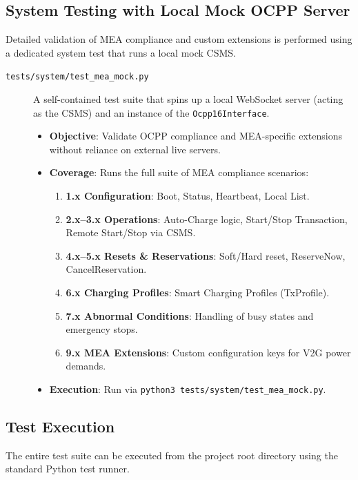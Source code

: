 \documentclass[a4paper,11pt]{report}
\begin{document}
\subsection{System Testing with Local Mock OCPP Server}
Detailed validation of MEA compliance and custom extensions is performed using a dedicated system test that runs a local mock CSMS.
\begin{description}
    \item[\texttt{tests/system/test\_mea\_mock.py}] A self-contained test suite that spins up a local WebSocket server (acting as the CSMS) and an instance of the \texttt{Ocpp16Interface}.
    \begin{itemize}
        \item \textbf{Objective}: Validate OCPP compliance and MEA-specific extensions without reliance on external live servers.
        \item \textbf{Coverage}: Runs the full suite of MEA compliance scenarios:
        \begin{enumerate}
            \item \textbf{1.x Configuration}: Boot, Status, Heartbeat, Local List.
            \item \textbf{2.x--3.x Operations}: Auto-Charge logic, Start/Stop Transaction, Remote Start/Stop via CSMS.
            \item \textbf{4.x--5.x Resets \& Reservations}: Soft/Hard reset, ReserveNow, CancelReservation.
            \item \textbf{6.x Charging Profiles}: Smart Charging Profiles (TxProfile).
            \item \textbf{7.x Abnormal Conditions}: Handling of busy states and emergency stops.
            \item \textbf{9.x MEA Extensions}: Custom configuration keys for V2G power demands.
        \end{enumerate}
        \item \textbf{Execution}: Run via \texttt{python3 tests/system/test\_mea\_mock.py}.
    \end{itemize}
\end{description}

\subsection{Test Execution}
The entire test suite can be executed from the project root directory using the standard Python test runner.
\end{document}
